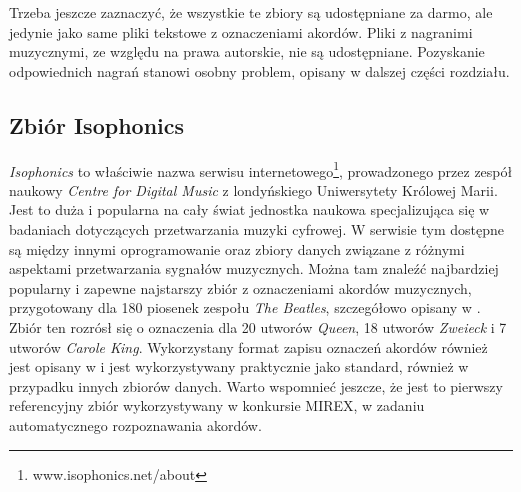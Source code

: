 \begin{table}
    \centering
    \caption{Fragment indeksu zbioru danych po pierwszym etapie jego tworzenia}
    \label{tab:indeks_01}
\end{table}

Trzeba jeszcze zaznaczyć, że wszystkie te zbiory są udostępniane za darmo, ale jedynie jako same
pliki tekstowe z oznaczeniami akordów. Pliki z nagranimi muzycznymi, ze względu na prawa autorskie,
nie są udostępniane. Pozyskanie odpowiednich nagrań stanowi osobny problem, opisany w dalszej części
rozdziału.

\subsection{Zbiór Isophonics}

\emph{Isophonics} to właściwie nazwa serwisu internetowego\footnote{www.isophonics.net/about},
prowadzonego przez zespół naukowy \emph{Centre for Digital Music} z londyńskiego Uniwersytety
Królowej Marii. Jest to duża i popularna na cały świat jednostka naukowa specjalizująca się w
badaniach dotyczących przetwarzania muzyki cyfrowej. W serwisie tym dostępne są między innymi
oprogramowanie oraz zbiory danych związane z różnymi aspektami przetwarzania sygnałów muzycznych.
Można tam znaleźć najbardziej popularny i zapewne najstarszy zbiór z oznaczeniami akordów
muzycznych, przygotowany dla 180 piosenek zespołu \emph{The Beatles}, szczegółowo opisany w
\cite{harte_towards_nodate}. Zbiór ten rozrósł się o oznaczenia dla 20 utworów \emph{Queen}, 18
utworów \emph{Zweieck} i 7 utworów \emph{Carole King}. Wykorzystany format zapisu oznaczeń akordów
również jest opisany w \cite{harte_towards_nodate} i jest wykorzystywany praktycznie jako standard,
również w przypadku innych zbiorów danych. Warto wspomnieć jeszcze, że jest to pierwszy referencyjny
zbiór wykorzystywany w konkursie MIREX, w zadaniu automatycznego rozpoznawania akordów.


